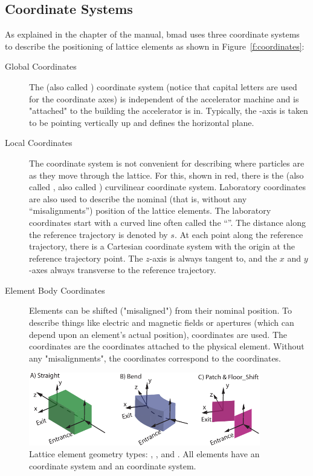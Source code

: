\documentclass{hitec}     %
\begin{document}
{%
\subsection{Coordinate Systems}
\label{s:coord.sys}

As explained in the  chapter of the \bmad manual, bmad uses three coordinate
systems to describe the positioning of lattice elements as shown in Figure~\ref{f:coordinates}:
\begin{description}
\item[Global Coordinates] \Newline
The   (also called ) coordinate system (notice that capital
letters are used for the coordinate axes) is independent of the accelerator machine and is "attached" to the building the
accelerator is in. Typically, the -axis is taken to be pointing vertically up and 
defines the horizontal plane.
%
\item[Local Coordinates] \Newline
The  coordinate system is not convenient for describing where particles are as they move
through the lattice. For this, shown in red, there is the  (also called ,
also called ) curvilinear coordinate system. Laboratory coordinates are also used to
describe the nominal (that is, without any ``misalignments'') position of the lattice elements. The
laboratory coordinates start with a curved line often called the ``''. The
distance along the reference trajectory is denoted by $s$. At each point along the reference
trajectory, there is a Cartesian  coordinate system with the origin at the reference
trajectory point. The $z$-axis is always tangent to, and the $x$ and
$y$-axes always transverse to the reference trajectory.
%
\item[Element Body Coordinates] \Newline
Elements can be shifted ("misaligned") from their nominal position. To describe things like electric
and magnetic fields or apertures (which can depend upon an element's actual position), 
coordinates are used.  The  coordinates are the coordinates attached to the
physical element. Without any "misalignments", the  coordinates correspond to the
 coordinates.
\end{description}

\begin{figure}[tb]
  \centering
  \includegraphics[width=0.9\textwidth]{figures/element-coord-frame.pdf}
  \caption{Lattice element geometry types: , , and . All elements have an 
 coordinate system and an  coordinate system.}
  \label{f:body.types}
\end{figure}

}
\end{document}
